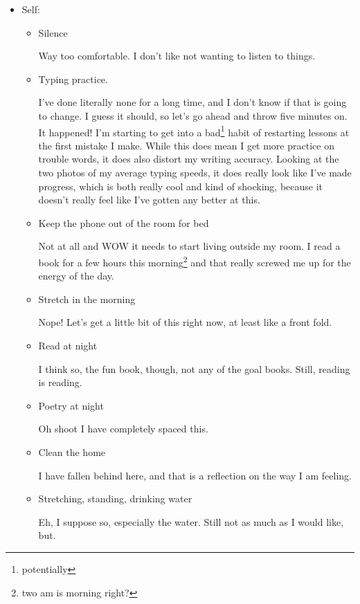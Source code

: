 \documentclass[12pt]{article}
\renewcommand{\,}{\textsuperscript{,}}
\begin{document}
\begin{itemize}
\begin{itemize}
\begin{itemize}
\end{itemize}

\item Self:

\begin{itemize}

\item Silence

Way too comfortable. I don't like not wanting to listen to things.

\item Typing practice.

I've done literally none for a long time, and I don't know if that is going to change. I guess it should, so let's go ahead and throw five minutes on.  
It happened! I'm starting to get into a bad\footnote{potentially} habit of restarting lessons at the first mistake I make.  
While this does mean I get more practice on trouble words, it does also distort my writing accuracy.  
Looking at the two photos of my average typing speeds, it does really look like I've made progress, which is both really cool and kind of shocking, because it doesn't really feel like I've gotten any better at this.

\item Keep the phone out of the room for bed

Not at all and WOW it needs to start living outside my room.  
I read a book for a few hours this morning\footnote{two am is morning right?} and that really screwed me up for the energy of the day.

\item Stretch in the morning

Nope! Let's get a little bit of this right now, at least like a front fold.

\item Read at night

I think so, the fun book, though, not any of the goal books. Still, reading is reading.

\item Poetry at night

Oh shoot I have completely spaced this.

\item Clean the home

I have fallen behind here, and that is a reflection on the way I am feeling.

\item Stretching, standing, drinking water

Eh, I suppose so, especially the water. Still not as much as I would like, but.


\end{itemize}
\end{itemize}
\end{itemize}
\end{document}
